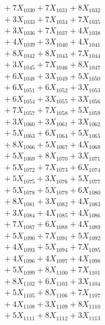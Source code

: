 \documentclass[a4paper,10pt]{article}
\begin{document}
{\begin{align}
&\;  + 7 X_{1030} + 7 X_{1031} + 8 X_{1032} \\[0.3ex]
&\;  + 3 X_{1033} + 7 X_{1034} + 7 X_{1035} \\[0.3ex]
&\;  + 3 X_{1036} + 7 X_{1037} + 4 X_{1038} \\[0.3ex]
&\;  + 4 X_{1039} + 3 X_{1040} + 4 X_{1041} \\[0.3ex]
&\;  + 8 X_{1042} + 8 X_{1043} + 7 X_{1044} \\[0.3ex]
&\;  + 3 X_{1045} + 7 X_{1046} + 8 X_{1047} \\[0.3ex]
&\;  + 6 X_{1048} + 3 X_{1049} + 5 X_{1050} \\[0.3ex]
&\;  + 6 X_{1051} + 6 X_{1052} + 3 X_{1053} \\[0.3ex]
&\;  + 6 X_{1054} + 3 X_{1055} + 3 X_{1056} \\[0.3ex]
&\;  + 7 X_{1057} + 7 X_{1058} + 5 X_{1059} \\[0.5ex]\allowbreak
&\;  + 3 X_{1060} + 3 X_{1061} + 3 X_{1062} \\[0.3ex]
&\;  + 5 X_{1063} + 6 X_{1064} + 5 X_{1065} \\[0.3ex]
&\;  + 8 X_{1066} + 5 X_{1067} + 4 X_{1068} \\[0.3ex]
&\;  + 5 X_{1069} + 8 X_{1070} + 3 X_{1071} \\[0.3ex]
&\;  + 5 X_{1072} + 7 X_{1073} + 6 X_{1074} \\[0.3ex]
&\;  + 5 X_{1075} + 3 X_{1076} + 5 X_{1077} \\[0.3ex]
&\;  + 5 X_{1078} + 5 X_{1079} + 6 X_{1080} \\[0.3ex]
&\;  + 8 X_{1081} + 3 X_{1082} + 4 X_{1083} \\[0.3ex]
&\;  + 3 X_{1084} + 4 X_{1085} + 4 X_{1086} \\[0.3ex]
&\;  + 7 X_{1087} + 6 X_{1088} + 4 X_{1089} \\[0.5ex]\allowbreak
&\;  + 5 X_{1090} + 7 X_{1091} + 5 X_{1092} \\[0.3ex]
&\;  + 4 X_{1093} + 5 X_{1094} + 7 X_{1095} \\[0.3ex]
&\;  + 4 X_{1096} + 4 X_{1097} + 4 X_{1098} \\[0.3ex]
&\;  + 5 X_{1099} + 8 X_{1100} + 7 X_{1101} \\[0.3ex]
&\;  + 8 X_{1102} + 6 X_{1103} + 3 X_{1104} \\[0.3ex]
&\;  + 5 X_{1105} + 8 X_{1106} + 7 X_{1107} \\[0.3ex]
&\;  + 4 X_{1108} + 3 X_{1109} + 8 X_{1110} \\[0.3ex]
&\;  + 5 X_{1111} + 8 X_{1112} + 3 X_{1113} \\[0.3ex]

\end{align}}
\end{document}
